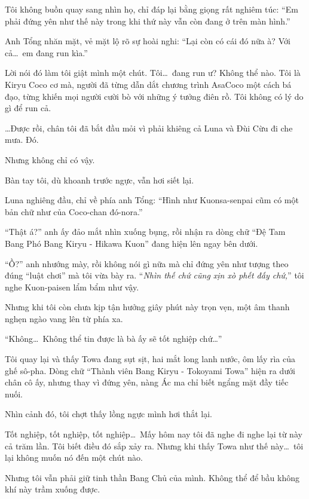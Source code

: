 \documentclass[../main.tex]{subfiles}
\begin{document}

Tôi không buồn quay sang nhìn họ, chỉ đáp lại bằng giọng rất nghiêm túc: ``Em phải đứng yên như thế này trong khi thứ này vẫn còn đang ở trên màn hình.''

Anh Tổng nhăn mặt, vẻ mặt lộ rõ sự hoài nghi: ``Lại còn có cái đó nữa à? Với cả\dots\ em đang run kìa.''

Lời nói đó làm tôi giật mình một chút. Tôi\dots\ đang run ư? Không thể nào. Tôi là Kiryu Coco cơ mà, người đã từng dẫn dắt chương trình AsaCoco một cách bá đạo, từng khiến mọi người cười bò với những ý tưởng điên rồ. Tôi không có lý do gì để run cả.

\dots Được rồi, chân tôi đã bắt đầu mỏi vì phải khiêng cả Luna và Đùi Cừu đi che mưa. Đó.

Nhưng không chỉ có vậy.

Bàn tay tôi, dù khoanh trước ngực, vẫn hơi siết lại.

Luna nghiêng đầu, chỉ về phía anh Tổng: ``Hình như Kuonsa-senpai cũm có một bản chữ như của Coco-chan đó-nora.''

``Thật á?'' anh ấy đảo mắt nhìn xuống bụng, rồi nhận ra dòng chữ ``Đệ Tam Bang Phó Bang Kiryu - Hikawa Kuon'' đang hiện lên ngay bên dưới.

``Ồ?'' anh nhướng mày, rồi không nói gì nữa mà chỉ đứng yên như tượng theo đúng ``luật chơi'' mà tôi vừa bày ra. ``\textit{Nhìn thế chứ cũng xịn xò phết đấy chứ,}'' tôi nghe Kuon-paisen lẩm bẩm như vậy.

Nhưng khi tôi còn chưa kịp tận hưởng giây phút này trọn vẹn, một âm thanh nghẹn ngào vang lên từ phía xa.

``Không\dots\ Không thể tin được là bà ấy sẽ tốt nghiệp chứ\dots''

Tôi quay lại và thấy Towa đang sụt sịt, hai mắt long lanh nước, ôm lấy rìa của ghế sô-pha. Dòng chữ ``Thành viên Bang Kiryu - Tokoyami Towa'' hiện ra dưới chân cô ấy, nhưng thay vì đứng yên, nàng Ác ma chỉ biết ngẩng mặt đầy tiếc nuối.


Nhìn cảnh đó, tôi chợt thấy lồng ngực mình hơi thắt lại.

Tốt nghiệp, tốt nghiệp, tốt nghiệp\dots\ Mấy hôm nay tôi đã nghe đi nghe lại từ này cả trăm lần. Tôi biết điều đó sắp xảy ra. Nhưng khi thấy Towa như thế này\dots\ tôi lại không muốn nó đến một chút nào.

Nhưng tôi vẫn phải giữ tinh thần Bang Chủ của mình. Không thể để bầu không khí này trầm xuống được.
\end{document}
